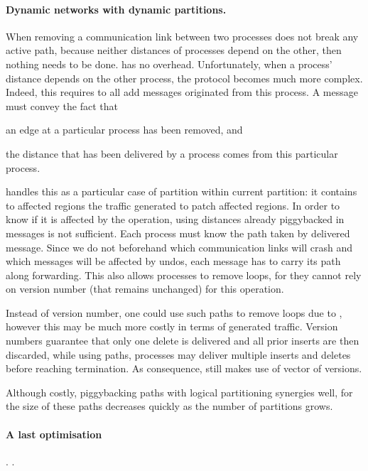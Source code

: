 \paragraph{Dynamic networks with dynamic partitions.}
When removing a communication link between two processes does not
break any active path, because neither distances of processes depend
on the other, then nothing needs to be done. \NAME has no overhead.
Unfortunately, when a process' distance depends on the other process,
the protocol becomes much more complex. Indeed, this requires to
 all add messages originated from this process. A message
must convey the fact that
\begin{inparaenum}[(i)]
\item an edge at a particular process has been removed, and
\item the distance that has been delivered by a process comes from
  this particular process.
\end{inparaenum}

\noindent \NAME handles this as a particular case of partition within
current partition: it contains to affected regions the traffic
generated to patch affected regions. In order to know if it is
affected by the  operation, using distances already
piggybacked in messages is not sufficient.  Each process must know the
path taken by delivered message. Since we do not beforehand which
communication links will crash and which messages will be affected by
undos, each message has to carry its path along forwarding. This also
allows processes to remove loops, for they cannot rely on version
number (that remains unchanged) for this operation.

\noindent Instead of version number, one could use such paths to remove loops
due to , however this may be much more costly in
terms of generated traffic. Version numbers guarantee that only one
delete is delivered and all prior inserts are then discarded, while
using paths, processes may deliver multiple inserts and deletes before
reaching termination.  As
consequence, \NAME still makes use of vector of versions.

\noindent Although costly, piggybacking paths with logical partitioning synergies
well, for the size of these paths decreases quickly as the number of
partitions grows.

\paragraph{A last optimisation}
 . .

